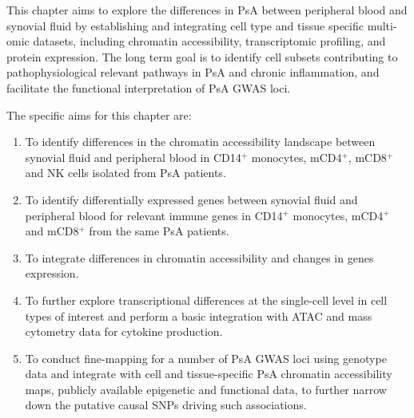 This chapter aims to explore the differences in PsA between peripheral blood and synovial fluid by establishing and integrating cell type and tissue specific multi-omic datasets, including chromatin accessibility, transcriptomic profiling, and protein expression. The long term goal is to identify cell subsets contributing to pathophysiological relevant pathways in PsA and chronic inflammation, and facilitate the functional interpretation of PsA GWAS loci. 


The specific aims for this chapter are:


\begin{enumerate}
\item To identify differences in the chromatin accessibility landscape between synovial fluid and peripheral blood in CD14$^+$ monocytes, mCD4$^+$, mCD8$^+$ and NK cells isolated from PsA patients.

\item To identify differentially expressed genes between synovial fluid and peripheral blood for relevant immune genes in CD14$^+$ monocytes, mCD4$^+$ and mCD8$^+$ from the same PsA patients.

\item To integrate differences in chromatin accessibility and changes in genes expression.
  
\item To further explore transcriptional differences at the single-cell level in cell types of interest and perform a basic integration with ATAC and mass cytometry data for cytokine production.

 \item To conduct fine-mapping for a number of PsA GWAS loci using genotype data and integrate with cell and tissue-specific PsA chromatin accessibility maps, publicly available epigenetic and functional data, to further narrow down the putative causal SNPs driving such associations.
\end{enumerate}




